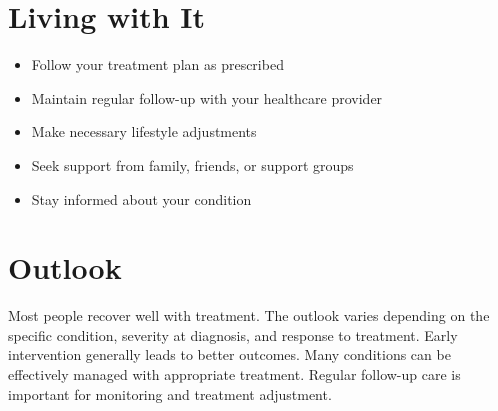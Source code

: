 \section{Living with It}
\begin{itemize}[noitemsep]
  \item Follow your treatment plan as prescribed
  \item Maintain regular follow-up with your healthcare provider
  \item Make necessary lifestyle adjustments
  \item Seek support from family, friends, or support groups
  \item Stay informed about your condition
\end{itemize}
\section{Outlook}
Most people recover well with treatment. The outlook varies depending on the specific condition, severity at diagnosis, and response to treatment. Early intervention generally leads to better outcomes. Many conditions can be effectively managed with appropriate treatment. Regular follow-up care is important for monitoring and treatment adjustment.
